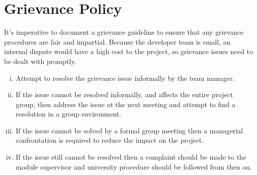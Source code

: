 \section{Grievance Policy}

\begin{fullwidth}

It's imperative to document a grievance guideline to ensure that any grievance procedures are fair and impartial. %
 Because the developer team is small, an internal dispute would have a high cost to the project, so grievance issues need to be dealt with promptly. 
  
\begin{enumerate}[i)]
    \item{Attempt to resolve the grievance issue informally by the team manager.}
    \item{If the issue cannot be resolved informally, and affects the entire project group, then address the issue at the next meeting and attempt to find a resolution in a group environment.}
    \item{If the issue cannot be solved by a formal group meeting then a managerial confrontation is required to reduce the impact on the project.}
    \item{If the issue still cannot be resolved then a complaint should be made to the module supervisor and university procedure should be followed from then on.}
\end{enumerate}

\end{fullwidth}
\clearpage
